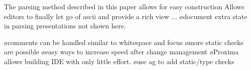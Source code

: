\documentclass[12pt]{article}
\begin{document}
The parsing method described in this paper allows for easy construction Allows editors to finally let go of ascii and provide a rich view ...
\ec
\bc
\bl
\o document extra state in parsing presentations not shown here.
\el

\bl
\o comments can be handled similar to whitespace and focus
\o more static checks are possible
\o easy ways to increase speed after change management
\o Proxima allows building IDE with only little effort.
\o use ag to add static/type checks
\el
\ec


%



\end{document}
